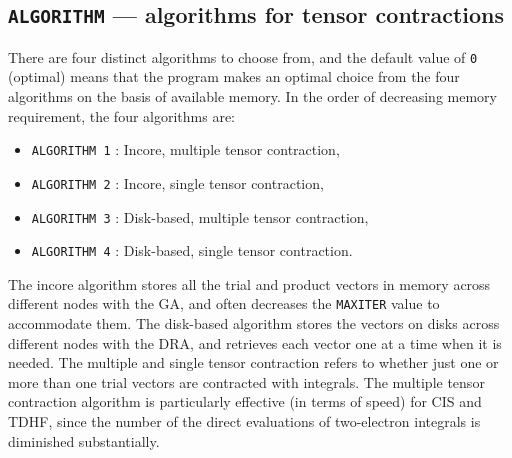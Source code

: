 \subsection{{\tt ALGORITHM} --- algorithms for tensor contractions}

There are four distinct algorithms to choose from, and the default value
of \verb+0+ (optimal) means that the program makes an optimal choice from the four
algorithms on the basis of available memory.  In the order of decreasing memory requirement,
the four algorithms are:
\begin{itemize}
\item \verb+ALGORITHM 1+ : Incore, multiple tensor contraction,
\item \verb+ALGORITHM 2+ : Incore, single tensor contraction,
\item \verb+ALGORITHM 3+ : Disk-based, multiple tensor contraction,
\item \verb+ALGORITHM 4+ : Disk-based, single tensor contraction.
\end{itemize}
The incore algorithm stores all the trial and product vectors in memory across
different nodes with the GA,
and often decreases the \verb+MAXITER+ value to accommodate them.  The disk-based
algorithm stores the vectors on disks across different nodes with the DRA, and
retrieves each vector one at a time when it is needed.  The multiple and single
tensor contraction refers to whether just one or more than one trial vectors
are contracted with integrals.  The multiple tensor contraction algorithm is 
particularly effective (in terms of speed) for CIS and TDHF, since the number of 
the direct evaluations of two-electron integrals is diminished substantially.

% 

